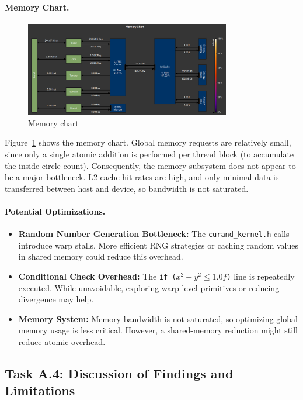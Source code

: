 \documentclass[12pt]{article}
\begin{document}
\paragraph{Memory Chart.}
\begin{figure}[ht]
      \centering
      \includegraphics[width=0.8\textwidth]{images/memory-chart.png}
      \caption{Memory chart}\label{fig:memory-chart}
\end{figure}
Figure~\ref{fig:memory-chart} shows the memory chart. Global memory requests
are relatively small, since only a single atomic addition is performed per
thread block (to accumulate the inside-circle count). Consequently, the memory
subsystem does not appear to be a major bottleneck. L2 cache hit rates are high,
and only minimal data is transferred between host and device, so bandwidth is
not saturated.

\paragraph{Potential Optimizations.}
\begin{itemize}
      \item \textbf{Random Number Generation Bottleneck:} The \texttt{curand\_kernel.h}
            calls introduce warp stalls. More efficient RNG strategies or caching random
            values in shared memory could reduce this overhead.
      \item \textbf{Conditional Check Overhead:} The \texttt{if ($x^2 + y^2 \le 1.0f$)}
            line is repeatedly executed. While unavoidable, exploring warp-level
            primitives or reducing divergence may help.
      \item \textbf{Memory System:} Memory bandwidth is not saturated, so optimizing
            global memory usage is less critical. However, a shared-memory reduction
            might still reduce atomic overhead.
\end{itemize}

\subsection{Task A.4: Discussion of Findings and Limitations}
\end{document}

